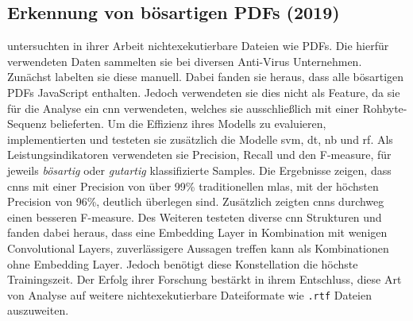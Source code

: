 \documentclass[
    12pt, %
    DIV10,
    ngerman, %
    a4paper, %
    oneside, %
    titlepage, %
    parskip=half, %
    headings=normal, %
    listof=totoc, %
    bibliography=totoc, %
    index=totoc, %
    captions=tableheading, %
    final %
]{scrreprt}
\begin{document}
\subsection{Erkennung von bösartigen PDFs (2019)}
\textcite{Jeong2019} untersuchten in ihrer Arbeit nichtexekutierbare Dateien wie PDFs. Die hierfür verwendeten Daten sammelten sie bei diversen Anti-Virus Unternehmen. Zunächst labelten sie diese manuell. Dabei fanden sie heraus, dass alle bösartigen PDFs JavaScript enthalten. Jedoch verwendeten sie dies nicht als Feature, da sie für die Analyse ein \ac{cnn} verwendeten, welches sie ausschlie{\ss}lich mit einer Rohbyte-Sequenz belieferten. Um die Effizienz ihres Modells zu evaluieren, implementierten und testeten sie zusätzlich die Modelle \ac{svm}, \ac{dt}, \acl{nb} und \ac{rf}. Als Leistungsindikatoren verwendeten sie Precision, Recall und den F-measure, für jeweils \emph{bösartig} oder \emph{gutartig} klassifizierte Samples. Die Ergebnisse zeigen, dass \ac{cnns} mit einer Precision von über 99\% traditionellen \ac{mlas}, mit der höchsten Precision von 96\%, deutlich überlegen sind. Zusätzlich zeigten \ac{cnns} durchweg einen besseren F-measure. Des Weiteren testeten \citeauthor{Jeong2019} diverse \ac{cnn} Strukturen und fanden dabei heraus, dass eine Embedding Layer in Kombination mit wenigen Convolutional Layers, zuverlässigere Aussagen treffen kann als Kombinationen ohne Embedding Layer. Jedoch benötigt diese Konstellation die höchste Trainingszeit. Der Erfolg ihrer Forschung bestärkt \citeauthor{Jeong2019} in ihrem Entschluss, diese Art von Analyse auf weitere nichtexekutierbare Dateiformate wie \texttt{.rtf} Dateien auszuweiten.
%
\end{document}
